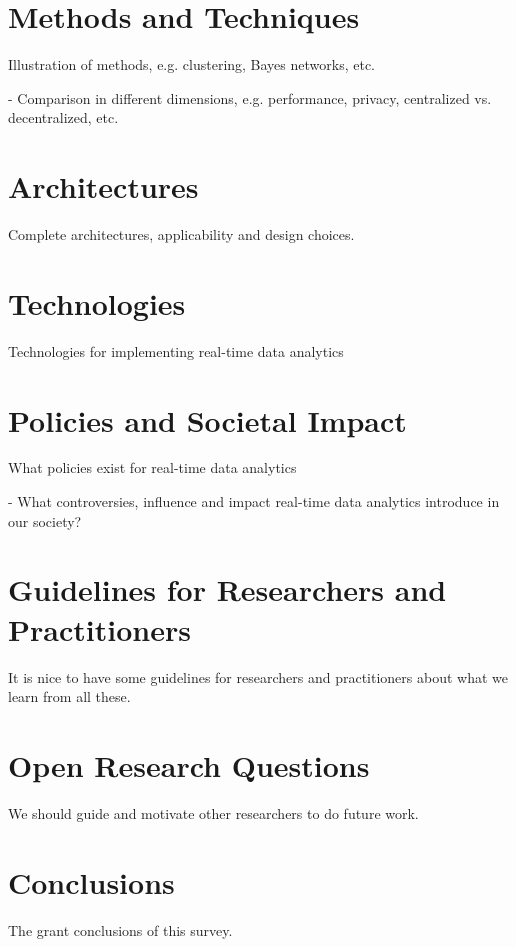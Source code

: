 \documentclass[10pt,twoside,twocolumn]{article}
\begin{document}
\section{Methods and Techniques}

Illustration of methods, e.g. clustering, Bayes networks, etc.

- Comparison in different dimensions, e.g. performance, privacy, centralized vs. decentralized, etc.

\section{Architectures}

Complete architectures, applicability and design choices.

\section{Technologies}

Technologies for implementing real-time data analytics

\section{Policies and Societal Impact}

What policies exist for real-time data analytics
	
- What controversies, influence and impact real-time data analytics introduce in our society?

\section{Guidelines for Researchers and Practitioners}

It is nice to have some guidelines for researchers and practitioners about what we learn from all these.

\section{Open Research Questions}

We should guide and motivate other researchers to do future work.

\section{Conclusions}

The grant conclusions of this survey. 

 

\end{document}
